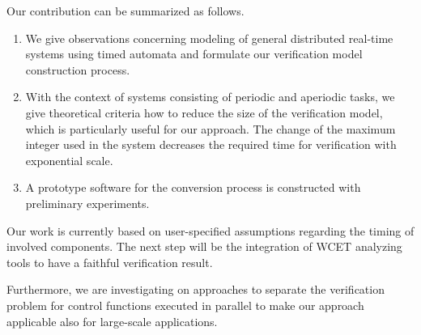 \documentclass[10pt, a4paper, onecolumn, conference, compsocconf]{IEEEtran}
\begin{document}
Our contribution can be summarized as follows.
\begin{enumerate}
    \item We give observations concerning modeling of general distributed real-time systems using timed automata and formulate our verification model construction process.
    \item With the context of systems consisting of periodic and aperiodic tasks, we give theoretical criteria how to reduce the size of the verification model, which is particularly useful for our approach. The change of the maximum integer used in the system decreases the required time for verification with exponential scale.
    \item A prototype software for the conversion process is constructed with preliminary experiments.
\end{enumerate}


Our work is currently based on user-specified assumptions regarding the timing of involved components. The next step will be the integration of WCET analyzing tools to have a faithful verification result.

Furthermore, we are investigating on approaches to separate the verification problem for control functions executed in parallel to make our approach applicable also for large-scale applications.




\end{document}
